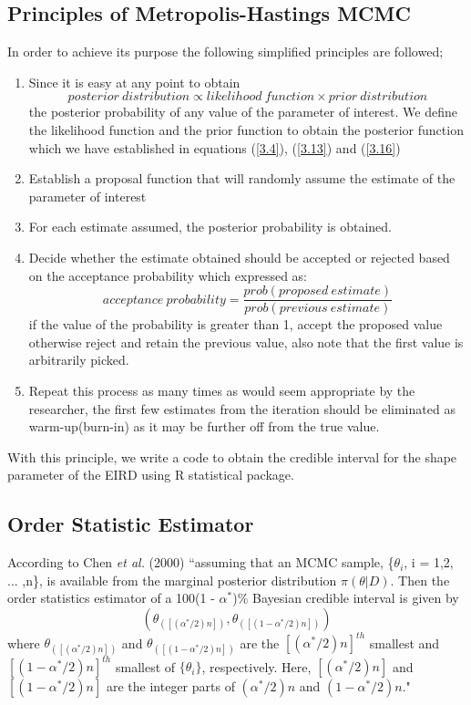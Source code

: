 \documentclass[a4paper,12pt]{report}
\newcommand{\para}{\hspace{0.5cm}}
\begin{document}
\subsection{Principles of Metropolis-Hastings MCMC}
\noindent\para In order to achieve its purpose the following simplified principles are followed;
\begin{enumerate}
\item Since it is easy at any point to obtain 
\[posterior\ distribution \propto likelihood\ function \times prior\ distribution\]
the posterior probability of any value of the parameter of interest. We define the likelihood function and the prior function to obtain the posterior function which we have established in equations (\ref{3.4}), (\ref{3.13}) and (\ref{3.16})
\item Establish a proposal function that will randomly assume the estimate of the parameter of interest
\item For each estimate assumed, the posterior probability is obtained.
\item Decide whether the estimate obtained should be accepted or rejected based on the acceptance probability which expressed as:
\[acceptance \ probability=\frac{prob(proposed\ estimate)}{prob(previous\ estimate)}\]
if the value of the probability is greater than 1, accept the proposed value otherwise reject and retain the previous value, also note that the first value is arbitrarily picked.
\item Repeat this process as many times as would seem appropriate by the researcher, the first few estimates from the iteration should be eliminated as warm-up(burn-in) as it may be further off from the true value.
\end{enumerate} 
\noindent\para With this principle, we write a code to obtain the credible interval for the shape parameter of the EIRD using R statistical package.

\subsection{Order Statistic Estimator}
\noindent\para According to Chen \textit{et al.} (2000) ``assuming that an MCMC sample, \{$\theta_i$, i = 1,2, ... ,n\}, is available from the marginal posterior distribution $\pi(\theta|D)$. Then the order statistics estimator of a 100(1 - $\alpha^*$)\% Bayesian credible interval is given by
\begin{equation}\label{OSE}
	(\theta_{([(\alpha^*/2)n])},\theta_{([(1-\alpha^*/2)n])})
\end{equation}
where $\theta_{([(\alpha^*/2)n])}$ and $\theta_{([(1-\alpha^*/2)n])}$ are the $[(\alpha^*/2)n]^{th}$ smallest and $[(1-\alpha^*/2)n]^{th}$ smallest of $\{\theta_i\}$, respectively. Here, $[(\alpha^*/2)n]$ and $[(1 - \alpha^*/2)n]$ are the integer parts of $(\alpha^*/2)n$ and $(1 - \alpha^*/2)n$."
\end{document}
